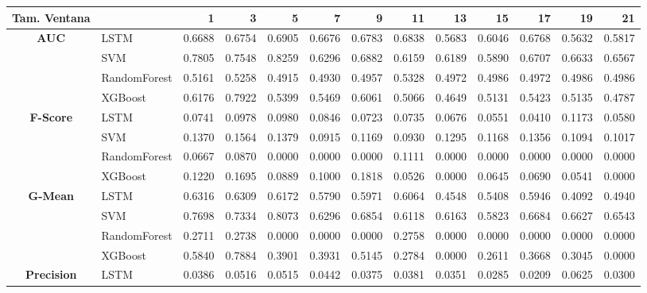 \begin{table}[h]
	\centering
	\begin{adjustbox}{max width=15cm}
		\begin{tabular}{|c|l|r|r|r|r|r|r|r|r|r|r|r|}
			\hline
			\textbf{Tam. Ventana} &         &      1  &      3  &      5  &      7  &      9  &      11 &      13 &      15 &      17 &      19 &      21 \\
			\hline
			\textbf{AUC} & LSTM &  0.6688 &  0.6754 &  0.6905 &  0.6676 &  0.6783 &  0.6838 &  0.5683 &  0.6046 &  0.6768 &  0.5632 &  0.5817 \\
			& SVM &  0.7805 &  0.7548 &  0.8259 &  0.6296 &  0.6882 &  0.6159 &  0.6189 &  0.5890 &  0.6707 &  0.6633 &  0.6567 \\
			& RandomForest &  0.5161 &  0.5258 &  0.4915 &  0.4930 &  0.4957 &  0.5328 &  0.4972 &  0.4986 &  0.4972 &  0.4986 &  0.4986 \\
			& XGBoost &  0.6176 &  0.7922 &  0.5399 &  0.5469 &  0.6061 &  0.5066 &  0.4649 &  0.5131 &  0.5423 &  0.5135 &  0.4787 \\
			\hline
			\textbf{F-Score} & LSTM &  0.0741 &  0.0978 &  0.0980 &  0.0846 &  0.0723 &  0.0735 &  0.0676 &  0.0551 &  0.0410 &  0.1173 &  0.0580 \\
			& SVM &  0.1370 &  0.1564 &  0.1379 &  0.0915 &  0.1169 &  0.0930 &  0.1295 &  0.1168 &  0.1356 &  0.1094 &  0.1017 \\
			& RandomForest &  0.0667 &  0.0870 &  0.0000 &  0.0000 &  0.0000 &  0.1111 &  0.0000 &  0.0000 &  0.0000 &  0.0000 &  0.0000 \\
			& XGBoost &  0.1220 &  0.1695 &  0.0889 &  0.1000 &  0.1818 &  0.0526 &  0.0000 &  0.0645 &  0.0690 &  0.0541 &  0.0000 \\
			\hline
			\textbf{G-Mean} & LSTM &  0.6316 &  0.6309 &  0.6172 &  0.5790 &  0.5971 &  0.6064 &  0.4548 &  0.5408 &  0.5946 &  0.4092 &  0.4940 \\
			& SVM &  0.7698 &  0.7334 &  0.8073 &  0.6296 &  0.6854 &  0.6118 &  0.6163 &  0.5823 &  0.6684 &  0.6627 &  0.6543 \\
			& RandomForest &  0.2711 &  0.2738 &  0.0000 &  0.0000 &  0.0000 &  0.2758 &  0.0000 &  0.0000 &  0.0000 &  0.0000 &  0.0000 \\
			& XGBoost &  0.5840 &  0.7884 &  0.3901 &  0.3931 &  0.5145 &  0.2784 &  0.0000 &  0.2611 &  0.3668 &  0.3045 &  0.0000 \\
			\hline
			\textbf{Precision} & LSTM &  0.0386 &  0.0516 &  0.0515 &  0.0442 &  0.0375 &  0.0381 &  0.0351 &  0.0285 &  0.0209 &  0.0625 &  0.0300 \\

\end{tabular}
\end{adjustbox}
\end{table}
